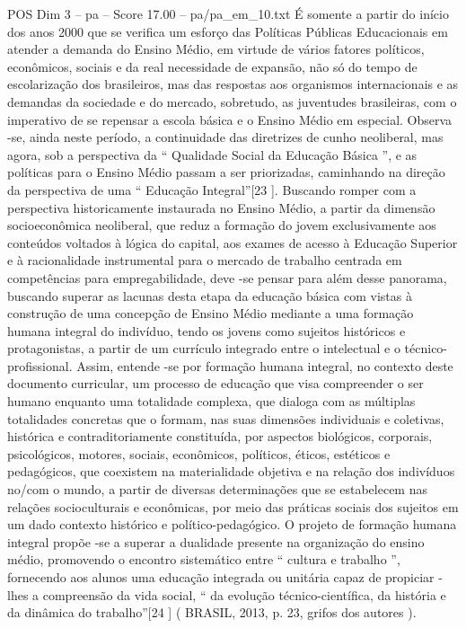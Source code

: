 \begin{textsample}{POS Dim 3 – pa – Score 17.00 – pa/pa\_em\_10.txt}
É somente a partir do início dos anos 2000 que se verifica um esforço das Políticas Públicas Educacionais em atender a demanda do Ensino Médio, em virtude de vários fatores políticos, econômicos, sociais e da real necessidade de expansão, não só do tempo de escolarização dos brasileiros, mas das respostas aos organismos internacionais e as demandas da sociedade e do mercado, sobretudo, as juventudes brasileiras, com o imperativo de se repensar a escola básica e o Ensino Médio em especial.
Observa -se, ainda neste período, a continuidade das diretrizes de cunho neoliberal, mas agora, sob a perspectiva da “ Qualidade Social da Educação Básica ”, e as políticas para o Ensino Médio passam a ser priorizadas, caminhando na direção da perspectiva de uma “ Educação Integral”[23 ].
Buscando romper com a perspectiva historicamente instaurada no Ensino Médio, a partir da dimensão socioeconômica neoliberal, que reduz a formação do jovem exclusivamente aos conteúdos voltados à lógica do capital, aos exames de acesso à Educação Superior e à racionalidade instrumental para o mercado de trabalho centrada em competências para empregabilidade, deve -se pensar para além desse panorama, buscando superar as lacunas desta etapa da educação básica com vistas à construção de uma concepção de Ensino Médio mediante a uma formação humana integral do indivíduo, tendo os jovens como sujeitos históricos e protagonistas, a partir de um currículo integrado entre o intelectual e o técnico-profissional.
Assim, entende -se por formação humana integral, no contexto deste documento curricular, um processo de educação que visa compreender o ser humano enquanto uma totalidade complexa, que dialoga com as múltiplas totalidades concretas que o formam, nas suas dimensões individuais e coletivas, histórica e contraditoriamente constituída, por aspectos biológicos, corporais, psicológicos, motores, sociais, econômicos, políticos, éticos, estéticos e pedagógicos, que coexistem na materialidade objetiva e na relação dos indivíduos no/com o mundo, a partir de diversas determinações que se estabelecem nas relações socioculturais e econômicas, por meio das práticas sociais dos sujeitos em um dado contexto histórico e político-pedagógico.
O projeto de formação humana integral propõe -se a superar a dualidade presente na organização do ensino médio, promovendo o encontro sistemático entre “ cultura e trabalho ”, fornecendo aos alunos uma educação integrada ou unitária capaz de propiciar -lhes a compreensão da vida social, “ da evolução técnico-científica, da história e da dinâmica do trabalho”[24 ] ( BRASIL, 2013, p. 23, grifos dos autores ).

\end{textsample}
